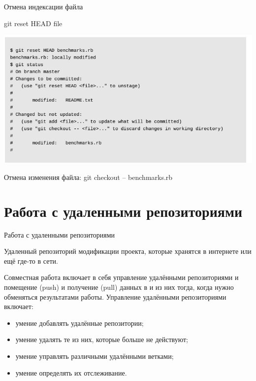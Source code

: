 \documentclass{beamer}
\begin{document}
\begin{frame}{Отмена индексации файла}
\begin{block}{git reset HEAD file}
\begin{center}
\includegraphics[scale=0.5]{images/reset.png}
\end{center}
\end{block}
Отмена изменения файла: git checkout -- benchmarks.rb
\end{frame}

\section{Работа с удаленными репозиториями}
\begin{frame}{Работа с удаленными репозиториями}
\begin{block}{Удаленный репозиторий}
модификации проекта, которые хранятся в интернете или ещё где-то в сети.
\end{block}
Совместная работа включает в себя управление удалёнными репозиториями и помещение
(push) и получение (pull) данных в и из них тогда, когда нужно обменяться результатами работы.
Управление удалёнными репозиториями включает:
\begin{itemize}
\item умение добавлять удалённые репозитории;
\item умение удалять те из них, которые больше не действуют;
\item умение управлять различными удалёнными ветками;
\item умение определять их отслеживание. 
\end{itemize}
\end{frame}
\end{document}
